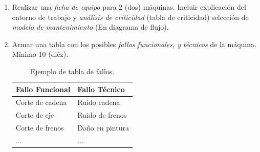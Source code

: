 \documentclass[a4paper]{article}
\begin{document}
\begin{enumerate}
    
    \item Realizar una \textit{ficha de equipo} para 2 (dos) máquinas. Incluir explicación del entorno de trabajo y \textit{análisis de criticidad} (tabla de criticidad) selección de \textit{modelo de mantenimiento} (En diagrama de flujo). 
    \item Armar una tabla con los posibles \textit{fallos funcionales, y técnicos} de la máquina. Mínimo 10 (diéz).

  \begin{table}[htbp]
\begin{center}
\begin{tabular}{|l|l|}
\hline
Fallo Funcional & Fallo Técnico \\
\hline \hline
Corte de cadena & Ruido cadena \\ \hline
Corte de eje & Ruido de frenos \\ \hline
Corte de frenos & Daño en pintura \\ \hline
... & ... \\ \hline
\end{tabular}
\caption{Ejemplo de tabla de fallos.}
\label{tabla:sencilla}
\end{center}
\end{table}


\end{enumerate}
\end{document}
